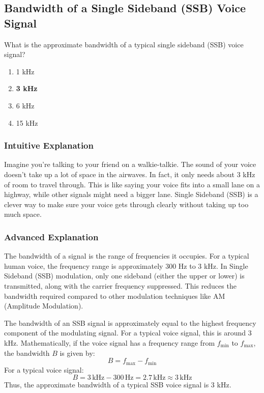 \subsection{Bandwidth of a Single Sideband (SSB) Voice Signal}\label{T8A08}

\begin{tcolorbox}[colback=gray!10!white,colframe=black!75!black,title=T8A08]
What is the approximate bandwidth of a typical single sideband (SSB) voice signal?
\begin{enumerate}[label=\Alph*)]
    \item 1 kHz
    \item \textbf{3 kHz}
    \item 6 kHz
    \item 15 kHz
\end{enumerate}
\end{tcolorbox}

\subsubsection*{Intuitive Explanation}
Imagine you're talking to your friend on a walkie-talkie. The sound of your voice doesn't take up a lot of space in the airwaves. In fact, it only needs about 3 kHz of room to travel through. This is like saying your voice fits into a small lane on a highway, while other signals might need a bigger lane. Single Sideband (SSB) is a clever way to make sure your voice gets through clearly without taking up too much space.

\subsubsection*{Advanced Explanation}
The bandwidth of a signal is the range of frequencies it occupies. For a typical human voice, the frequency range is approximately 300 Hz to 3 kHz. In Single Sideband (SSB) modulation, only one sideband (either the upper or lower) is transmitted, along with the carrier frequency suppressed. This reduces the bandwidth required compared to other modulation techniques like AM (Amplitude Modulation).

The bandwidth of an SSB signal is approximately equal to the highest frequency component of the modulating signal. For a typical voice signal, this is around 3 kHz. Mathematically, if the voice signal has a frequency range from \( f_{\text{min}} \) to \( f_{\text{max}} \), the bandwidth \( B \) is given by:
\[
B = f_{\text{max}} - f_{\text{min}}
\]
For a typical voice signal:
\[
B = 3\, \text{kHz} - 300\, \text{Hz} = 2.7\, \text{kHz} \approx 3\, \text{kHz}
\]
Thus, the approximate bandwidth of a typical SSB voice signal is 3 kHz.

